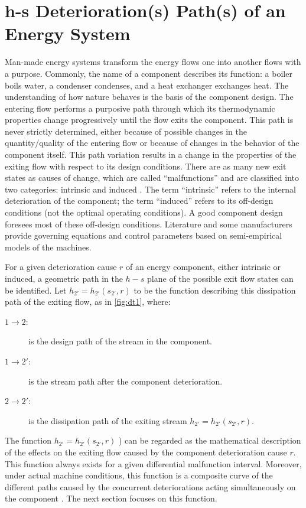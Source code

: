 \documentclass[energies,article,submit,moreauthors,pdftex]{Definitions/mdpi}
\begin{document}
\section{h-s Deterioration(s) Path(s) of an Energy System}
Man-made energy systems transform the energy flows one into another flows with a purpose. Commonly, the name of a component describes its function: a boiler boils water, a condenser condenses, and a heat exchanger exchanges heat. The understanding of how nature behaves is the basis of the component design. The entering flow performs a purposive path through which its thermodynamic properties change progressively until the flow exits the component. This path is never strictly determined, either because of possible changes in the quantity/quality of the entering flow or because of changes in the behavior of the component itself. This path variation results in a change in the properties of the exiting flow with respect to its design conditions. There are as many new exit states as causes of change, which are called “malfunctions” and are classified into two categories: intrinsic and induced \cite{Valero2004c,Valero1999c,Torres1999}. The term “intrinsic” refers to the internal deterioration of the component; the term “induced” refers to its off-design conditions (not the optimal operating conditions). A good component design foresees most of these off-design conditions. Literature and some manufacturers provide governing equations and control parameters based on semi-empirical models of the machines.

For a given deterioration cause $r$ of an energy component, either intrinsic or induced, a geometric path in the $h-s$ plane of the possible exit flow states can be identified. Let $h_{2'}=h_{2'}(s_{2'}, r)$ to be the function describing this dissipation path of the exiting flow, as in \cref{fig:dt1}, where:

\begin{description}
	\item[$1 \longrightarrow 2:$]  is the design path of the stream in the component.
	\item[$1 \longrightarrow 2':$] is the stream path after the component deterioration.
	\item[$2 \longrightarrow 2':$] is the dissipation path of the exiting stream $h_{2'} = h_{2'} (s_{2'}, r).$
\end{description}

The function $h_{2'}=h_{2'} (s_{2'}, r)$ ) can be regarded as the mathematical description of the effects on the exiting flow caused by the component deterioration cause $r$. This function always exists for a given differential malfunction interval. Moreover, under actual machine conditions, this function is a composite curve of the different paths caused by the concurrent deteriorations acting simultaneously on the component \cite{Valero2004c}. The next section focuses on this function.
\end{document}
